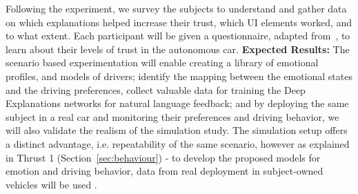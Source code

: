 Following the experiment, we survey the subjects to understand and gather data on which explanations helped increase their trust, which UI elements worked, and to what extent.
Each participant will be given a questionnaire, adapted from~\cite{merritt2013trust}, to learn about their levels of trust in the autonomous car. 
\newline
\noindent \textbf{Expected Results:} The scenario based experimentation will enable creating a library of emotional profiles, and models of drivers; identify the mapping between the emotional states and the driving preferences, collect valuable data for training the Deep Explanations networks for natural language feedback; and by deploying the same subject in a real car and monitoring their preferences and driving behavior, we will also validate the realism of the simulation study. 
The simulation setup offers a distinct advantage, i.e. repeatability of the same scenario, however as explained in Thrust 1 (Section~\ref{sec:behaviour}) - to develop the proposed models for emotion and driving behavior, data from real deployment in subject-owned vehicles will be used . 


